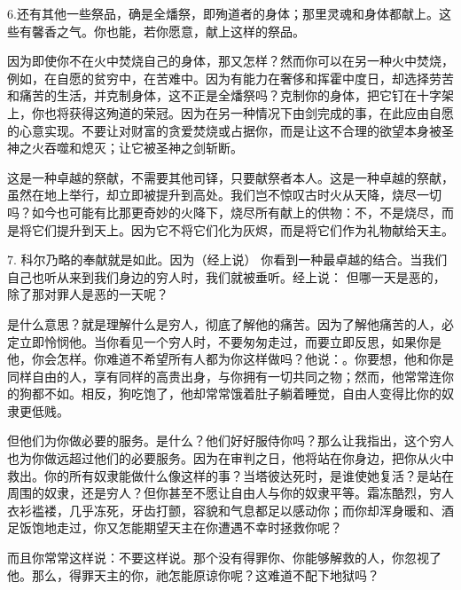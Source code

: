 6.\newline{}还有其他一些祭品，确是全燔祭，即殉道者的身体；那里灵魂和身体都献上。这些有馨香之气。你也能，若你愿意，献上这样的祭品。\par

因为即使你不在火中焚烧自己的身体，那又怎样？然而你可以在另一种火中焚烧，例如，在自愿的贫穷中，在苦难中。因为有能力在奢侈和挥霍中度日，却选择劳苦和痛苦的生活，并克制身体，这不正是全燔祭吗？克制你的身体，把它钉在十字架上，你也将获得这殉道的荣冠。因为在另一种情况下由剑完成的事，在此应由自愿的心意实现。不要让对财富的贪爱焚烧或占据你，而是让这不合理的欲望本身被圣神之火吞噬和熄灭；让它被圣神之剑斩断。\par

这是一种卓越的祭献，不需要其他司铎，只要献祭者本人。这是一种卓越的祭献，虽然在地上举行，却立即被提升到高处。我们岂不惊叹古时火从天降，烧尽一切吗？如今也可能有比那更奇妙的火降下，烧尽所有献上的供物：不，不是烧尽，而是将它们提升到天上。因为它不将它们化为灰烬，而是将它们作为礼物献给天主。\par

7. 科尔乃略的奉献就是如此。因为（经上说） 你看到一种最卓越的结合。当我们自己也听从来到我们身边的穷人时，我们就被垂听。经上说：  但哪一天是恶的，除了那对罪人是恶的一天呢？\par

是什么意思？就是理解什么是穷人，彻底了解他的痛苦。因为了解他痛苦的人，必定立即怜悯他。当你看见一个穷人时，不要匆匆走过，而要立即反思，如果你是他，你会怎样。你难道不希望所有人都为你这样做吗？他说：。你要想，他和你是同样自由的人，享有同样的高贵出身，与你拥有一切共同之物；然而，他常常连你的狗都不如。相反，狗吃饱了，他却常常饿着肚子躺着睡觉，自由人变得比你的奴隶更低贱。\par

但他们为你做必要的服务。是什么？他们好好服侍你吗？那么让我指出，这个穷人也为你做远超过他们的必要服务。因为在审判之日，他将站在你身边，把你从火中救出。你的所有奴隶能做什么像这样的事？当塔彼达死时，是谁使她复活？是站在周围的奴隶，还是穷人？但你甚至不愿让自由人与你的奴隶平等。霜冻酷烈，穷人衣衫褴褛，几乎冻死，牙齿打颤，容貌和气息都足以感动你；而你却浑身暖和、酒足饭饱地走过，你又怎能期望天主在你遭遇不幸时拯救你呢？\par

而且你常常这样说：不要这样说。那个没有得罪你、你能够解救的人，你忽视了他。那么，得罪天主的你，祂怎能原谅你呢？这难道不配下地狱吗？\par

